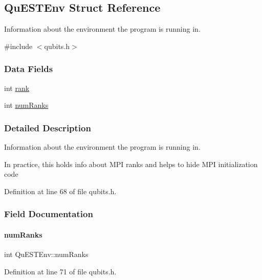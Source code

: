 \hypertarget{structQuESTEnv}{}\subsection{Qu\+E\+S\+T\+Env Struct Reference}
\label{structQuESTEnv}


Information about the environment the program is running in.  




{\ttfamily \#include $<$qubits.\+h$>$}

\subsubsection*{Data Fields}
\begin{DoxyCompactItemize}
\item 
int \mbox{\hyperlink{structQuESTEnv_aa648bb336cf8598467cb62db00b9cee8}{rank}}
\item 
int \mbox{\hyperlink{structQuESTEnv_af22aacd7c9905accae28484785c193b4}{num\+Ranks}}
\end{DoxyCompactItemize}


\subsubsection{Detailed Description}
Information about the environment the program is running in. 

In practice, this holds info about M\+PI ranks and helps to hide M\+PI initialization code 

Definition at line 68 of file qubits.\+h.



\subsubsection{Field Documentation}
\mbox{\label{structQuESTEnv_af22aacd7c9905accae28484785c193b4}} 
\paragraph{\texorpdfstring{num\+Ranks}{numRanks}}
{\footnotesize\ttfamily int Qu\+E\+S\+T\+Env\+::num\+Ranks}



Definition at line 71 of file qubits.\+h.

